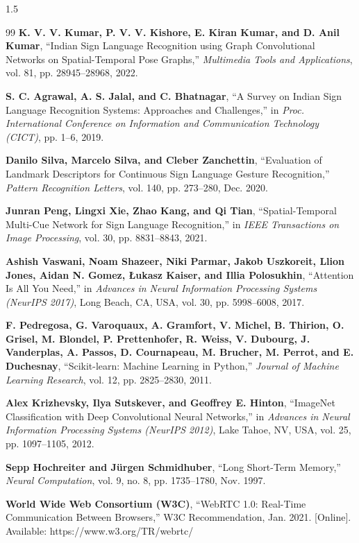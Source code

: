 \begin{spacing}{1.5}
\begin{thebibliography}{99}
 \textbf{K. V. V. Kumar, P. V. V. Kishore, E. Kiran Kumar, and D. Anil Kumar}, ``Indian Sign Language Recognition using Graph Convolutional Networks on Spatial-Temporal Pose Graphs,'' \textit{Multimedia Tools and Applications}, vol. 81, pp. 28945--28968, 2022.

 \textbf{S. C. Agrawal, A. S. Jalal, and C. Bhatnagar}, ``A Survey on Indian Sign Language Recognition Systems: Approaches and Challenges,'' in \textit{Proc. International Conference on Information and Communication Technology (CICT)}, pp. 1--6, 2019.

 \textbf{Danilo Silva, Marcelo Silva, and Cleber Zanchettin}, ``Evaluation of Landmark Descriptors for Continuous Sign Language Gesture Recognition,'' \textit{Pattern Recognition Letters}, vol. 140, pp. 273--280, Dec. 2020.

 \textbf{Junran Peng, Lingxi Xie, Zhao Kang, and Qi Tian}, ``Spatial-Temporal Multi-Cue Network for Sign Language Recognition,'' in \textit{IEEE Transactions on Image Processing}, vol. 30, pp. 8831--8843, 2021.

 \textbf{Ashish Vaswani, Noam Shazeer, Niki Parmar, Jakob Uszkoreit, Llion Jones, Aidan N. Gomez, {\L}ukasz Kaiser, and Illia Polosukhin}, ``Attention Is All You Need,'' in \textit{Advances in Neural Information Processing Systems (NeurIPS 2017)}, Long Beach, CA, USA, vol. 30, pp. 5998--6008, 2017.

 \textbf{F. Pedregosa, G. Varoquaux, A. Gramfort, V. Michel, B. Thirion, O. Grisel, M. Blondel, P. Prettenhofer, R. Weiss, V. Dubourg, J. Vanderplas, A. Passos, D. Cournapeau, M. Brucher, M. Perrot, and E. Duchesnay}, ``Scikit-learn: Machine Learning in Python,'' \textit{Journal of Machine Learning Research}, vol. 12, pp. 2825--2830, 2011.

 \textbf{Alex Krizhevsky, Ilya Sutskever, and Geoffrey E. Hinton}, ``ImageNet Classification with Deep Convolutional Neural Networks,'' in \textit{Advances in Neural Information Processing Systems (NeurIPS 2012)}, Lake Tahoe, NV, USA, vol. 25, pp. 1097--1105, 2012.

 \textbf{Sepp Hochreiter and J{\"u}rgen Schmidhuber}, ``Long Short-Term Memory,'' \textit{Neural Computation}, vol. 9, no. 8, pp. 1735--1780, Nov. 1997.

 \textbf{World Wide Web Consortium (W3C)}, ``WebRTC 1.0: Real-Time Communication Between Browsers,'' W3C Recommendation, Jan. 2021. [Online]. Available: https://www.w3.org/TR/webrtc/

\end{thebibliography}
\end{spacing}
	

